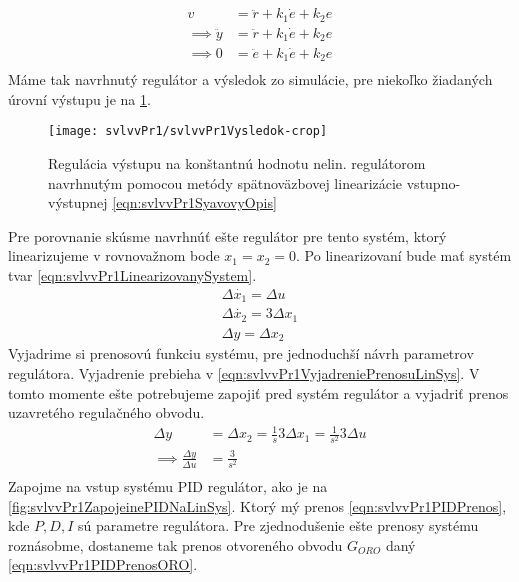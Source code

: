 \documentclass[../main.tex]{subfiles}
\begin{document}
	\begin{equation}
	\begin{aligned}
	v &= \ddot{r}  +k_1 \dot{e} + k_2 e \\
	\implies \ddot{y} &= \ddot{r}  +k_1 \dot{e} + k_2 e \\
	\implies 0 &= \ddot{e}  + k_1 \dot{e} + k_2 e \\
	\end{aligned}
	\label{eqn:svlvvPr1DynamikaOdchylky}
	\end{equation}
	Máme tak navrhnutý regulátor a výsledok zo simulácie, pre niekoľko žiadaných úrovní výstupu je na \cref{fig:svlvvPr1Vysledok}.
	\begin{figure}[h!]
		\centering
		\texttt{[image: svlvvPr1/svlvvPr1Vysledok-crop]}
		\caption{Regulácia výstupu na konštantnú hodnotu nelin. regulátorom navrhnutým pomocou metódy spätnoväzbovej linearizácie vstupno-výstupnej \cref{eqn:svlvvPr1SyavovyOpis}}
		\label{fig:svlvvPr1Vysledok}
	\end{figure}
	Pre porovnanie skúsme navrhnúť ešte regulátor pre tento systém, ktorý linearizujeme v rovnovažnom bode $x_1 = x_2 = 0$. Po linearizovaní bude mať systém tvar \cref{eqn:svlvvPr1LinearizovanySystem}. 
	\begin{equation}
	\begin{gathered}
	\Delta \dot{x_1}  = \Delta u \\
	\Delta \dot{x_2} = 3\Delta x_1 \\
	\Delta y = \Delta  x_2
	\end{gathered}
	\label{eqn:svlvvPr1LinearizovanySystem}
	\end{equation}
	Vyjadrime si prenosovú funkciu systému, pre jednoduchší návrh parametrov regulátora. Vyjadrenie prebieha v \cref{eqn:svlvvPr1VyjadreniePrenosuLinSys}. V tomto momente ešte potrebujeme zapojiť pred systém regulátor a vyjadriť prenos uzavretého regulačného obvodu.
	\begin{equation}
	\begin{aligned}
		\Delta  y &= \Delta x_2 = \frac{1}{s}  3 \Delta x_1 = \frac{1}{s^2}  3 \Delta u \\
		\implies \frac{\Delta y}{\Delta u } &= \frac{3}{s^2} \\
	\end{aligned}
	\label{eqn:svlvvPr1VyjadreniePrenosuLinSys}
	\end{equation}
	Zapojme na vstup systému PID regulátor, ako je na \cref{fig:svlvvPr1ZapojeinePIDNaLinSys}. Ktorý mý prenos \cref{eqn:svlvvPr1PIDPrenos}, kde $P, D, I$ sú parametre regulátora. Pre zjednodušenie ešte prenosy systému roznásobme, dostaneme tak prenos otvoreného obvodu $G_{ORO}$ daný \cref{eqn:svlvvPr1PIDPrenosORO}. 
\end{document}
